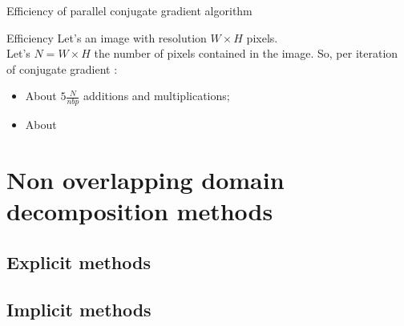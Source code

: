 \documentclass[compress,10pt,aspectratio=169]{beamer}
\begin{document}
\begin{frame}[fragile]{Efficiency of parallel conjugate gradient algorithm}
  \scriptsize
  \begin{block}{Efficiency}
    Let's an image with resolution $W\times H$ pixels.\\
    Let's $N = W \times H$ the number of pixels contained in the image. So, per iteration of conjugate gradient :
    \begin{itemize}
    \item About $5\frac{N}{nbp}$ additions and multiplications;
    \item About %
    \end{itemize}
  \end{block}
\end{frame}


\section{Non overlapping domain decomposition methods}

\subsection{Explicit methods}

\subsection{Implicit methods}
\end{document}

